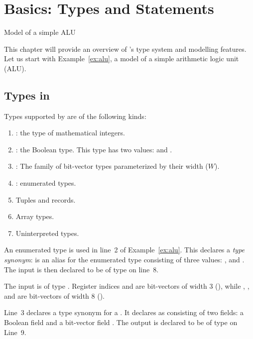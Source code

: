 \chapter{Basics: Types and Statements}
\begin{uclidlisting}[htbp]
    
    \caption{Model of a simple ALU}
\label{ex:alu}
\end{uclidlisting}

This chapter will provide an overview of \uclid{}'s type system and modelling features. Let us start with Example~\ref{ex:alu}, a model of a simple arithmetic logic unit (ALU).

\section{Types in \uclid{}}

Types supported by \uclid{} are of the following kinds:
\begin{enumerate}
    \item {}: the type of mathematical integers.
    \item {}: the Boolean type. This type has two values:  and .
    \item {}: The family of bit-vector types parameterized by their width ($W$).
    \item {}: enumerated types.
    \item Tuples and records.
    \item Array types.
    \item Uninterpreted types.
\end{enumerate}

An enumerated type is used in line~2 of Example~\ref{ex:alu}. This declares a \textit{type synonym}:  is an alias for the enumerated type consisting of three values: ,  and . The input  is then declared to be of type  on line~8.

The input  is of type . Register indices  and  are bit-vectors of width 3 (), while , ,  and  are bit-vectors of width 8 ().

Line~3 declares a type synonym for a . It declares  as consisting of two fields: a Boolean field  and a bit-vector field . The output  is declared to be of type  on Line~9.

